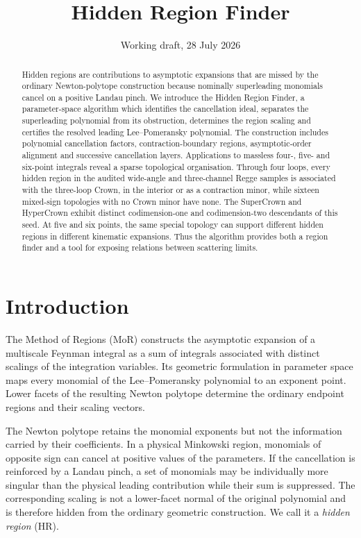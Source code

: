 \documentclass[a4paper,11pt]{article}
\title{\bfseries Hidden Region Finder}
\author{}
\date{Working draft, 28 July 2026}
\begin{document}
\maketitle

\begin{abstract}
Hidden regions are contributions to asymptotic expansions that are missed by
the ordinary Newton-polytope construction because nominally superleading
monomials cancel on a positive Landau pinch.  We introduce the Hidden Region
Finder, a parameter-space algorithm which identifies the cancellation ideal,
separates the superleading polynomial from its obstruction, determines the
region scaling and certifies the resolved leading Lee--Pomeransky polynomial.
The construction includes polynomial cancellation factors,
contraction-boundary regions, asymptotic-order alignment and successive
cancellation layers.  Applications to massless four-, five- and six-point
integrals reveal a sparse topological organisation.  Through four loops,
every hidden region in the audited wide-angle and three-channel Regge samples
is associated with the three-loop Crown, in the interior or as a contraction
minor, while sixteen mixed-sign topologies with no Crown minor have none.  The
SuperCrown and HyperCrown exhibit distinct codimension-one and
codimension-two descendants of this seed.  At five and six points, the same
special topology can support different hidden regions in different kinematic
expansions.  Thus the algorithm provides both a region finder and a tool for
exposing relations between scattering limits.
\end{abstract}

\tableofcontents

\section{Introduction}

The Method of Regions (MoR) constructs the asymptotic expansion of a
multiscale Feynman integral as a sum of integrals associated with distinct
scalings of the integration variables.  Its geometric formulation in
parameter space maps every monomial of the Lee--Pomeransky polynomial to an
exponent point.  Lower facets of the resulting Newton polytope determine the
ordinary endpoint regions and their scaling vectors.

The Newton polytope retains the monomial exponents but not the information
carried by their coefficients.  In a physical Minkowski region, monomials of
opposite sign can cancel at positive values of the parameters.  If the
cancellation is reinforced by a Landau pinch, a set of monomials may be
individually more singular than the physical leading contribution while
their sum is suppressed.  The corresponding scaling is not a lower-facet
normal of the original polynomial and is therefore hidden from the ordinary
geometric construction.  We call it a \emph{hidden region} (HR).
\end{document}
